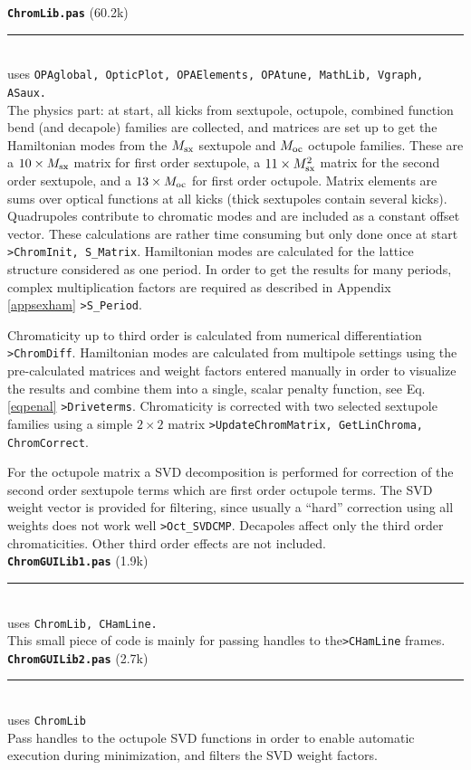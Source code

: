 \documentclass[12pt]{article}
\newcommand\code[1]{{\tt #1}}
\newcommand\opamodule[3]{{\bf \tt #1} #2\\  \rule[3pt]{\textwidth}{0.2pt} \\ {\scriptsize uses \tt  #3}\\[1ex]}
\begin{document}
\opamodule{ChromLib.pas}{(60.2k)}{OPAglobal, OpticPlot, OPAElements, OPAtune,  MathLib, Vgraph, ASaux.}
The physics part: at start, all kicks from sextupole, octupole, combined function bend (and decapole) families are collected, and matrices are set up to get the Hamiltonian modes from the $M_{\rm sx}$ sextupole and $M_{\rm oc}$ octupole families. These are a $10\times  M_{\rm sx}$ matrix for first order sextupole, a $11\times  M_{\rm sx}^2$ matrix for the second order sextupole, and a  $13\times  M_{\rm oc}$ for first order octupole. Matrix elements are sums over optical functions at all kicks (thick sextupoles contain several kicks). Quadrupoles contribute to chromatic modes and are included as a constant offset vector. These calculations are rather time consuming but only done once at start \code{>ChromInit, S\_Matrix}. Hamiltonian modes are calculated for the lattice structure considered as one period. In order to get the results for many periods, complex multiplication factors are required as described in Appendix \ref{appsexham} \code{>S\_Period}.

Chromaticity up to third order is calculated from numerical differentiation \code{>ChromDiff}. Hamiltonian modes are calculated from multipole settings using the pre-calculated matrices and weight factors entered manually in order to visualize the results and combine them into a single, scalar penalty function, see Eq.\ref{eqpenal} \code{>Driveterms}. Chromaticity is corrected with two selected sextupole families using a simple $2\times 2$ matrix \code{>UpdateChromMatrix, GetLinChroma, ChromCorrect}.

For the octupole matrix a SVD decomposition is performed for correction of the second order sextupole terms which are first order octupole terms. The SVD weight vector is provided for filtering, since usually a ``hard'' correction using all weights does not work well \code{>Oct\_SVDCMP}.
Decapoles affect only the third order chromaticities. Other third order effects are not included.\\

\opamodule{ChromGUILib1.pas}{(1.9k)}{ChromLib, CHamLine.}
This small piece of code is mainly for passing handles to the\code{>CHamLine} frames.\\

\opamodule{ChromGUILib2.pas}{(2.7k)}{ChromLib}
Pass handles to the octupole SVD functions in order to enable automatic execution during minimization, and filters the SVD weight factors.\\
\end{document}
